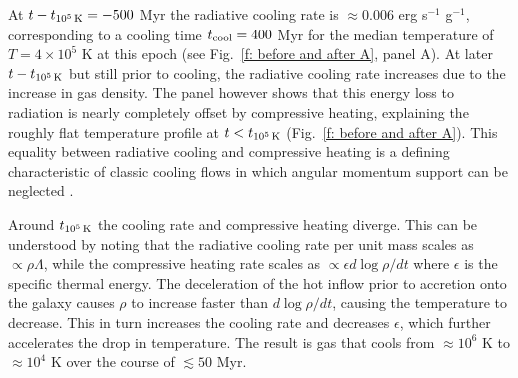 \documentclass[fleqn,usenatbib]{mnras}
\newcommand{\tcools}{t_{10^5\,{\rm K}}}
\begin{document}
At $t-\tcools=-500$ Myr the radiative cooling rate is $\approx0.006$ erg s$^{-1}$ g$^{-1}$, corresponding to a cooling time $t_{\rm cool}=400$ Myr for the median temperature of $T=4\times 10^5$ K at this epoch (see Fig.~\ref{f: before and after A}, panel A). 
At later $t-\tcools$ but still prior to cooling, the radiative cooling rate increases due to the increase in gas density.
The panel however shows that this energy loss to radiation  is nearly completely offset by compressive heating, explaining the roughly flat temperature profile at $t<\tcools$ (Fig.~\ref{f: before and after A}). 
This equality
between radiative cooling and compressive heating is a defining characteristic of classic cooling flows in which angular momentum support can be neglected \citep{Mathews1978, McNamara2007, Stern2019}. 

Around $\tcools$ the cooling rate and compressive heating diverge.
This can be understood by noting that the radiative cooling rate per unit mass scales as $\propto\rho\Lambda$, while the compressive heating rate scales as $\propto\epsilon d\log\rho/d t$ where $\epsilon$ is the specific thermal energy.
The deceleration of the hot inflow prior to accretion onto the galaxy causes $\rho$ to increase faster than $d\log\rho/d t$, causing the temperature to decrease.
This in turn increases the cooling rate and decreases $\epsilon$, which further accelerates the drop in temperature.
The result is gas that cools from $\approx10^6$ K to $\approx10^4$ K over the course of $\lesssim 50$ Myr.
\end{document}
